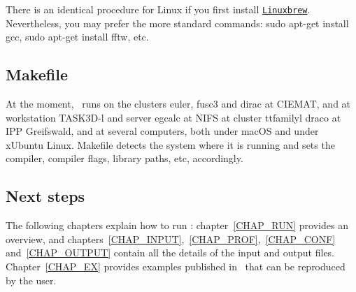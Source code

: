 There is an identical procedure for {\ttfamily Linux} if you first install \href{http://linuxbrew.sh}{\nolinkurl{Linuxbrew}}. Nevertheless, you may prefer the more standard commands: {\ttfamily sudo apt-get install gcc}, {\ttfamily sudo apt-get install fftw}, etc.




\subsection{{\ttfamily Makefile}}

At the moment, \KNOSOS~runs on the clusters {\ttfamily euler}, {\ttfamily fusc3} and {\ttfamily dirac} at CIEMAT, and at workstation {\ttfamily TASK3D-l} and server {\ttfamily egcalc} at NIFS at cluster {ttfamilyl draco} at IPP Greifswald, and at several computers, both under {\ttfamily macOS} and under {\ttfamily xUbuntu Linux}.  {\ttfamily Makefile} detects the system where it is running and sets the compiler, compiler flags, library paths, etc, accordingly.



\subsection{Next steps}

The following chapters explain how to run \KNOSOS: chapter~\ref{CHAP_RUN} provides an overview, and chapters~\ref{CHAP_INPUT},~\ref{CHAP_PROF},~\ref{CHAP_CONF} and~\ref{CHAP_OUTPUT} contain all the details of the input and output files. Chapter~\ref{CHAP_EX} provides examples published in~\citep{velasco2019knosos} that can be reproduced by the user.


